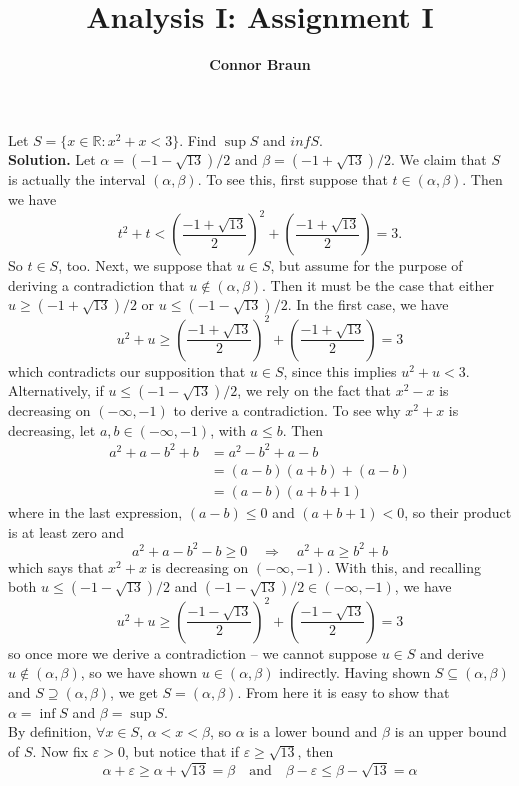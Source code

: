 \documentclass[11pt, letterpaper]{article}
\title{\bf Analysis I: Assignment I}
\author{\bf Connor Braun}
\date{}
\newcommand{\mbb}[1]{\mathbb{#1}}
\begin{document}
    \maketitle
     Let $S=\{x\in\mbb{R}:x^2+x<3\}$. Find $\sup S$ and $inf S$.\\[10pt]
    {\bf Solution.} Let $\alpha=(-1-\sqrt{13})/2$ and $\beta=(-1+\sqrt{13})/2$. We claim that $S$ is actually the interval
    $(\alpha,\beta)$. To see this, first suppose that $t\in(\alpha,\beta)$. Then we have
    \[t^2+t<\left(\frac{-1+\sqrt{13}}{2}\right)^2+\left(\frac{-1+\sqrt{13}}{2}\right)=3.\]
    So $t\in S$, too. Next, we suppose that $u\in S$, but assume for the purpose of deriving a contradiction that $u\notin(\alpha,\beta)$. Then it must
    be the case that either $u\geq (-1+\sqrt{13})/2$ or $u\leq(-1-\sqrt{13})/2$. In the first case, we have
    \[u^2+u\geq \left(\frac{-1+\sqrt{13}}{2}\right)^2+\left(\frac{-1+\sqrt{13}}{2}\right)=3\]
    which contradicts our supposition that $u\in S$, since this implies $u^2+u<3$. Alternatively, if $u\leq (-1-\sqrt{13})/2$, we rely on the fact that $x^2-x$ is decreasing on $(-\infty,-1)$ to derive a contradiction.
    To see why $x^2+x$ is decreasing, let $a,b\in(-\infty, -1)$, with $a\leq b$. Then
    \begin{align*}
        a^2+a-b^2+b&=a^2-b^2+a-b\\
        &=(a-b)(a+b)+(a-b)\\
        &=(a-b)(a+b+1)
    \end{align*}
    where in the last expression, $(a-b)\leq 0$ and $(a+b+1)<0$, so their product is at least zero and
    \[a^2+a-b^2-b\geq 0\quad\Rightarrow\quad a^2+a\geq b^2+b\]
    which says that $x^2+x$ is decreasing on $(-\infty,-1)$. With this, and recalling both $u\leq (-1-\sqrt{13})/2$ and $(-1-\sqrt{13})/2\in(-\infty,-1)$, we have
    \[u^2+u\geq \left(\frac{-1-\sqrt{13}}{2}\right)^2+\left(\frac{-1-\sqrt{13}}{2}\right)=3\]
    so once more we derive a contradiction -- we cannot suppose $u\in S$ and derive $u\notin (\alpha,\beta)$, so we have shown $u\in(\alpha,\beta)$ indirectly.
    Having shown $S\subseteq(\alpha,\beta)$ and $S\supseteq (\alpha,\beta)$, we get $S=(\alpha,\beta)$. From here it is easy to show that $\alpha=\inf S$ and $\beta=\sup S$.\\[10pt]
    By definition, $\forall x\in S$, $\alpha<x<\beta$, so $\alpha$ is a lower bound and $\beta$ is an upper bound of $S$. Now fix $\varepsilon>0$, but notice that if $\varepsilon\geq\sqrt{13}$, then
    \[\alpha+\varepsilon\geq\alpha+\sqrt{13}=\beta\quad\text{and}\quad \beta-\varepsilon\leq\beta-\sqrt{13}=\alpha\]
\end{document}
